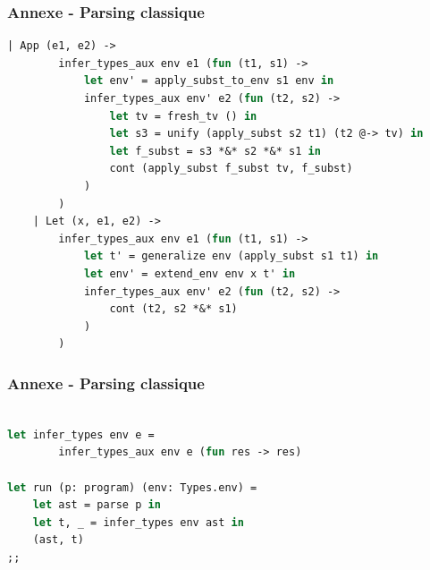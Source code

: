 \documentclass{beamer}
\begin{document}
\begin{frame}[fragile]
		\frametitle{Annexe - Parsing classique}
	
		\begin{lstlisting}[language=ML]
	| App (e1, e2) ->
        infer_types_aux env e1 (fun (t1, s1) ->
            let env' = apply_subst_to_env s1 env in
            infer_types_aux env' e2 (fun (t2, s2) ->
                let tv = fresh_tv () in
                let s3 = unify (apply_subst s2 t1) (t2 @-> tv) in
                let f_subst = s3 *&* s2 *&* s1 in
                cont (apply_subst f_subst tv, f_subst)
            )
        )
    | Let (x, e1, e2) ->
        infer_types_aux env e1 (fun (t1, s1) ->
            let t' = generalize env (apply_subst s1 t1) in
            let env' = extend_env env x t' in
            infer_types_aux env' e2 (fun (t2, s2) ->
                cont (t2, s2 *&* s1)
            )
        )
		\end{lstlisting}
\end{frame}
\begin{frame}[fragile]
		\frametitle{Annexe - Parsing classique}
		\begin{lstlisting}[language=ML]
				
let infer_types env e =
		infer_types_aux env e (fun res -> res)

let run (p: program) (env: Types.env) =
    let ast = parse p in
    let t, _ = infer_types env ast in
    (ast, t)
;;
		\end{lstlisting}
\end{frame}
\end{document}
